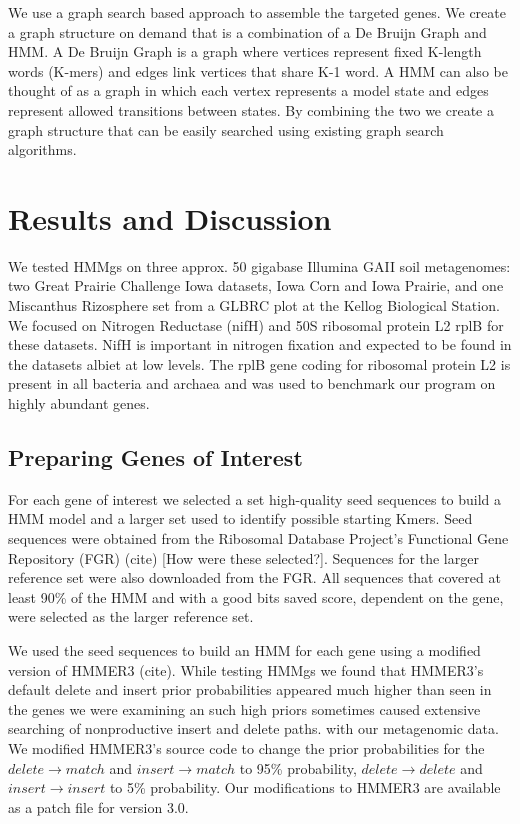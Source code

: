 \documentclass[10pt]{bmc_article}
\newenvironment{bmcformat}{\begin{raggedright}\baselineskip20pt\sloppy\setboolean{publ}{false}}{\end{raggedright}\baselineskip20pt\sloppy}
\begin{document}
\begin{bmcformat}
We use a graph search based approach to assemble the targeted genes.  We create a graph structure on demand that is a combination of a De Bruijn Graph and HMM.  A De Bruijn Graph is a graph where vertices represent fixed K-length words (K-mers) and edges link vertices that share K-1 word.  A HMM can also be thought of as a graph in which each vertex represents a model state and edges represent allowed transitions between states.  By combining the two we create a graph structure that can be easily searched using existing graph search algorithms.

 
\section*{Results and Discussion}
We tested HMMgs on three approx. 50 gigabase Illumina GAII soil metagenomes: two Great Prairie Challenge Iowa datasets, Iowa Corn and Iowa Prairie, and one Miscanthus Rizosphere set from a GLBRC plot at the Kellog Biological Station. We focused on Nitrogen Reductase (nifH) and 50S ribosomal protein L2 rplB for these datasets.  NifH is important in nitrogen fixation and expected to be found in the datasets albiet at low levels. The rplB gene coding for ribosomal protein L2 is present in all bacteria and archaea and was used to benchmark our program on highly abundant genes.

\subsection*{Preparing Genes of Interest}
For each gene of interest we selected a set high-quality seed sequences to build a HMM model and a larger set used to identify possible starting Kmers.  Seed sequences were obtained from the Ribosomal Database Project's Functional Gene Repository (FGR) (cite) [How were these selected?].  Sequences for the larger reference set were also downloaded from the FGR.  All sequences that covered at least 90\% of the HMM and with a good bits saved score, dependent on the gene, were selected as the larger reference set.

We used the seed sequences to build an HMM for each gene using a modified version of HMMER3 (cite). While testing HMMgs we found that HMMER3's default delete and insert prior probabilities appeared much higher than seen in the genes we were examining an such high priors sometimes caused extensive searching of nonproductive insert and delete paths. with our metagenomic data. We modified HMMER3's source code to change the prior probabilities for the $delete \rightarrow match$ and $insert \rightarrow match$ to 95\% probability, $delete \rightarrow delete$ and $insert \rightarrow insert$ to 5\% probability.  Our modifications to HMMER3 are available as a patch file for version 3.0.

\end{bmcformat}
\end{document}
